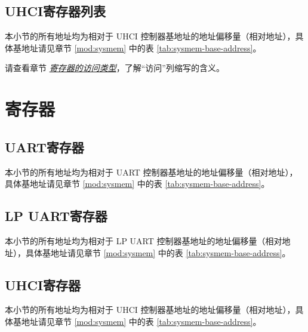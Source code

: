 \documentclass[main\_\_CN.tex]{subfiles}
\begin{document}
\subsection{UHCI寄存器列表}

本小节的所有地址均为相对于 UHCI 控制器基地址的地址偏移量（相对地址），具体基地址请见章节 \ref{mod:sysmem} \textit{} 中的表 \ref{tab:sysmem-base-address}。


请查看章节 \hyperref[glossary-access-types]{\textit{寄存器的访问类型}}，了解“访问”列缩写的含义。




\clearpage
\section{寄存器}

\subsection{UART寄存器}

本小节的所有地址均为相对于 UART 控制器基地址的地址偏移量（相对地址），具体基地址请见章节 \ref{mod:sysmem} \textit{} 中的表 \ref{tab:sysmem-base-address}。



\clearpage
\subsection{LP UART寄存器}

本小节的所有地址均为相对于 LP UART 控制器基地址的地址偏移量（相对地址），具体基地址请见章节 \ref{mod:sysmem} \textit{} 中的表 \ref{tab:sysmem-base-address}。



\clearpage
\subsection{UHCI寄存器}

本小节的所有地址均为相对于 UHCI 控制器基地址的地址偏移量（相对地址），具体基地址请见章节 \ref{mod:sysmem} \textit{} 中的表 \ref{tab:sysmem-base-address}。


\end{document}
